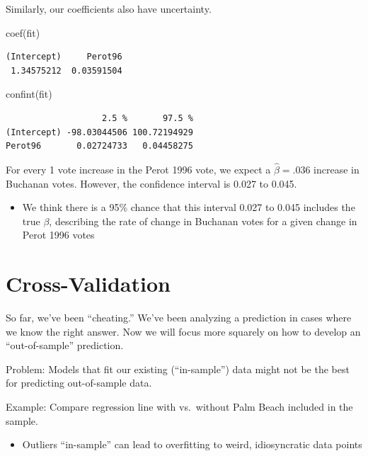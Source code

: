 \documentclass[
  letterpaper,
  DIV=11,
  numbers=noendperiod]{scrreprt}
\newenvironment{Shaded}{\begin{snugshade}}{\end{snugshade}}
\newcommand{\FunctionTok}[1]{\textcolor[rgb]{0.28,0.35,0.67}{#1}}
\newcommand{\NormalTok}[1]{\textcolor[rgb]{0.00,0.23,0.31}{#1}}
\providecommand{\tightlist}{%
  \setlength{\itemsep}{0pt}\setlength{\parskip}{0pt}}\usepackage{longtable,booktabs,array}
\begin{document}
Similarly, our coefficients also have uncertainty.

\begin{Shaded}
\begin{Highlighting}[]
\FunctionTok{coef}\NormalTok{(fit)}
\end{Highlighting}
\end{Shaded}

\begin{verbatim}
(Intercept)     Perot96 
 1.34575212  0.03591504 
\end{verbatim}

\begin{Shaded}
\begin{Highlighting}[]
\FunctionTok{confint}\NormalTok{(fit)}
\end{Highlighting}
\end{Shaded}

\begin{verbatim}
                   2.5 %       97.5 %
(Intercept) -98.03044506 100.72194929
Perot96       0.02724733   0.04458275
\end{verbatim}

For every 1 vote increase in the Perot 1996 vote, we expect a
\(\hat \beta =.036\) increase in Buchanan votes. However, the confidence
interval is 0.027 to 0.045.

\begin{itemize}
\tightlist
\item
  We think there is a 95\% chance that this interval 0.027 to 0.045
  includes the true \(\beta\), describing the rate of change in Buchanan
  votes for a given change in Perot 1996 votes
\end{itemize}

\hypertarget{cross-validation}{%
\section{Cross-Validation}\label{cross-validation}}

So far, we've been ``cheating.'' We've been analyzing a prediction in
cases where we know the right answer. Now we will focus more squarely on
how to develop an ``out-of-sample'' prediction.

Problem: Models that fit our existing (``in-sample'') data might not be
the best for predicting out-of-sample data.

Example: Compare regression line with vs.~without Palm Beach included in
the sample.

\begin{itemize}
\tightlist
\item
  Outliers ``in-sample'' can lead to overfitting to weird, idiosyncratic
  data points
\end{itemize}
\end{document}
